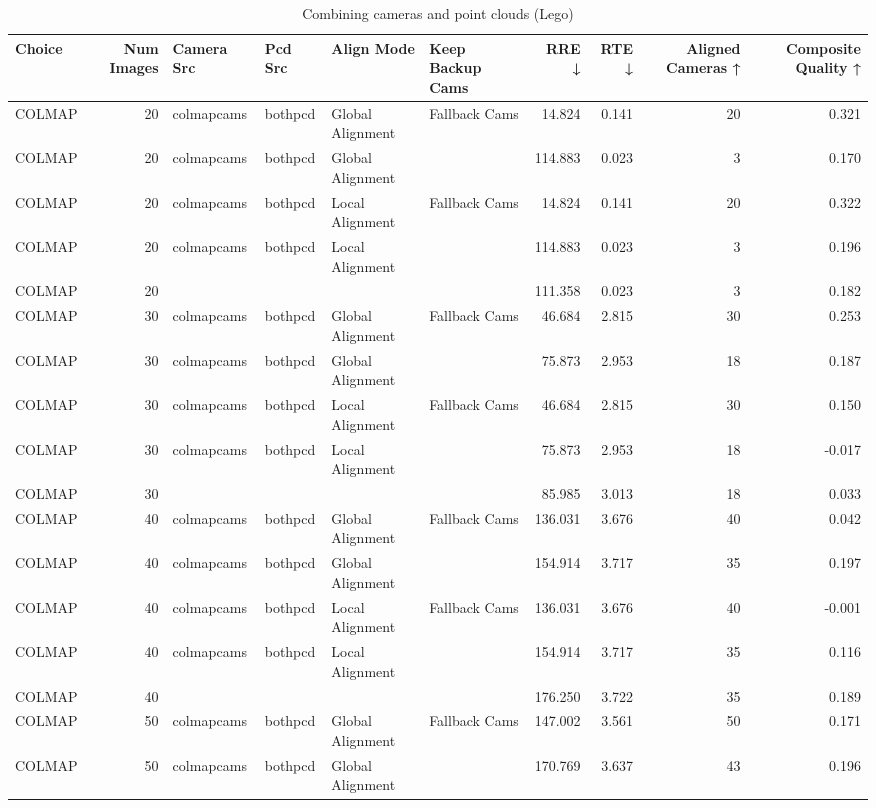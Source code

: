 \begin{table}[H]
\caption{Combining cameras and point clouds (Lego)}
\label{tab:07_combined_full_lego}
\begin{tabular}{lrllllrrrr}
\toprule
Choice & Num Images & Camera Src & Pcd Src & Align Mode & Keep Backup Cams & RRE ↓ & RTE ↓ & Aligned Cameras ↑ & Composite Quality ↑ \\
\midrule
COLMAP & 20 & colmapcams & bothpcd & Global Alignment & Fallback Cams & 14.824 & 0.141 & 20 & 0.321 \\
COLMAP & 20 & colmapcams & bothpcd & Global Alignment &  & 114.883 & 0.023 & 3 & 0.170 \\
COLMAP & 20 & colmapcams & bothpcd & Local Alignment & Fallback Cams & 14.824 & 0.141 & 20 & 0.322 \\
COLMAP & 20 & colmapcams & bothpcd & Local Alignment &  & 114.883 & 0.023 & 3 & 0.196 \\
COLMAP & 20 &  &  &  &  & 111.358 & 0.023 & 3 & 0.182 \\
COLMAP & 30 & colmapcams & bothpcd & Global Alignment & Fallback Cams & 46.684 & 2.815 & 30 & 0.253 \\
COLMAP & 30 & colmapcams & bothpcd & Global Alignment &  & 75.873 & 2.953 & 18 & 0.187 \\
COLMAP & 30 & colmapcams & bothpcd & Local Alignment & Fallback Cams & 46.684 & 2.815 & 30 & 0.150 \\
COLMAP & 30 & colmapcams & bothpcd & Local Alignment &  & 75.873 & 2.953 & 18 & -0.017 \\
COLMAP & 30 &  &  &  &  & 85.985 & 3.013 & 18 & 0.033 \\
COLMAP & 40 & colmapcams & bothpcd & Global Alignment & Fallback Cams & 136.031 & 3.676 & 40 & 0.042 \\
COLMAP & 40 & colmapcams & bothpcd & Global Alignment &  & 154.914 & 3.717 & 35 & 0.197 \\
COLMAP & 40 & colmapcams & bothpcd & Local Alignment & Fallback Cams & 136.031 & 3.676 & 40 & -0.001 \\
COLMAP & 40 & colmapcams & bothpcd & Local Alignment &  & 154.914 & 3.717 & 35 & 0.116 \\
COLMAP & 40 &  &  &  &  & 176.250 & 3.722 & 35 & 0.189 \\
COLMAP & 50 & colmapcams & bothpcd & Global Alignment & Fallback Cams & 147.002 & 3.561 & 50 & 0.171 \\
COLMAP & 50 & colmapcams & bothpcd & Global Alignment &  & 170.769 & 3.637 & 43 & 0.196 \\

\end{tabular}
\end{table}

